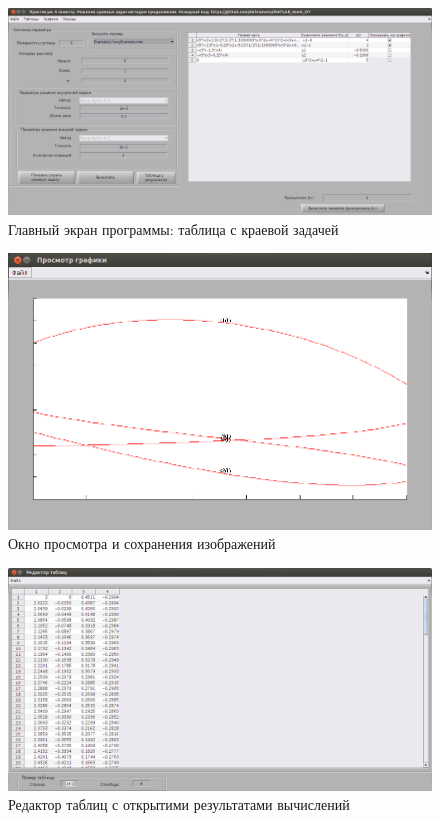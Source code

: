 \begin{figure}[h!] 
\begin{center}
\includegraphics[scale=0.25]{mainWindow_EP.jpeg}
\end{center}
\caption{Главный экран программы: таблица с краевой задачей}
\label{mainWindowPE_pic}
\end{figure}

\begin{figure}[h!] 
\begin{center}
\includegraphics[scale=0.4]{picturesViewer.jpeg}
\end{center}
\caption{Окно просмотра и сохранения изображений}
\label{picViewer_pic}
\end{figure}

\begin{figure}[h!] 
\begin{center}
\includegraphics[scale=0.3]{tableEditor.jpeg}
\end{center}
\caption{Редактор таблиц с открытими результатами вычислений}
\label{tableEditor_pic}
\end{figure}

